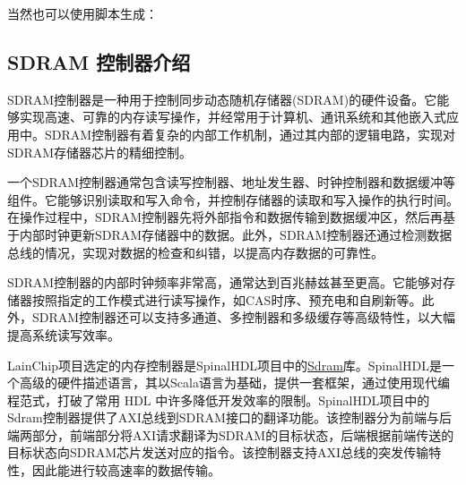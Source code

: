 当然也可以使用脚本生成：


\subsection{SDRAM 控制器介绍}\label{sec:15-chip-preparation-005}

SDRAM控制器是一种用于控制同步动态随机存储器(SDRAM)的硬件设备。它能够实现高速、可靠的内存读写操作，并经常用于计算机、通讯系统和其他嵌入式应用中。SDRAM控制器有着复杂的内部工作机制，通过其内部的逻辑电路，实现对SDRAM存储器芯片的精细控制。

一个SDRAM控制器通常包含读写控制器、地址发生器、时钟控制器和数据缓冲等组件。它能够识别读取和写入命令，并控制存储器的读取和写入操作的执行时间。在操作过程中，SDRAM控制器先将外部指令和数据传输到数据缓冲区，然后再基于内部时钟更新SDRAM存储器中的数据。此外，SDRAM控制器还通过检测数据总线的情况，实现对数据的检查和纠错，以提高内存数据的可靠性。

SDRAM控制器的内部时钟频率非常高，通常达到百兆赫兹甚至更高。它能够对存储器按照指定的工作模式进行读写操作，如CAS时序、预充电和自刷新等。此外，SDRAM控制器还可以支持多通道、多控制器和多级缓存等高级特性，以大幅提高系统读写效率。

LainChip项目选定的内存控制器是SpinalHDL项目中的\href{https://github.com/SpinalHDL/SpinalHDL/tree/dev/lib/src/main/scala/spinal/lib/memory/sdram}{Sdram}库。SpinalHDL是一个高级的硬件描述语言，其以Scala语言为基础，提供一套框架，通过使用现代编程范式，打破了常用
HDL
中许多降低开发效率的限制。SpinalHDL项目中的Sdram控制器提供了AXI总线到SDRAM接口的翻译功能。该控制器分为前端与后端两部分，前端部分将AXI请求翻译为SDRAM的目标状态，后端根据前端传送的目标状态向SDRAM芯片发送对应的指令。该控制器支持AXI总线的突发传输特性，因此能进行较高速率的数据传输。


